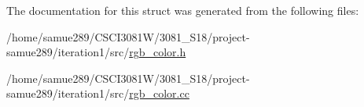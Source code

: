 The documentation for this struct was generated from the following files\+:\begin{DoxyCompactItemize}
\item 
/home/samue289/\+C\+S\+C\+I3081\+W/3081\+\_\+\+S18/project-\/samue289/iteration1/src/\hyperlink{rgb__color_8h}{rgb\+\_\+color.\+h}\item 
/home/samue289/\+C\+S\+C\+I3081\+W/3081\+\_\+\+S18/project-\/samue289/iteration1/src/\hyperlink{rgb__color_8cc}{rgb\+\_\+color.\+cc}\end{DoxyCompactItemize}
